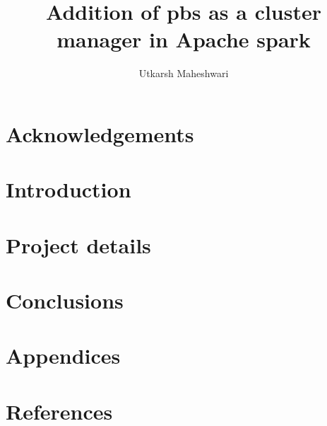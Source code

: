 \documentclass[12pt, a4paper, oneside, titlepage]{report}
\title{Addition of \gls{pbs} as a cluster manager in Apache \gls{spark}}
\author{Utkarsh Maheshwari}
\begin{document}
\makecover
\maketitlepage
\makeabstract

\chapter{Acknowledgements}


\tableofcontents

\chapter{Introduction}


\chapter{Project details}


\chapter{Conclusions}


\chapter{Appendices}


\chapter{References}


\printglossaries
\end{document}
